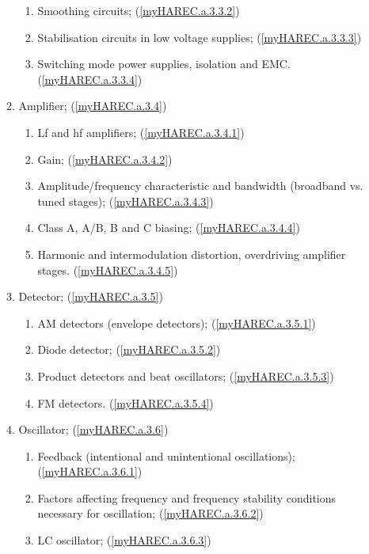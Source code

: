 \begin{enumerate}
\begin{enumerate}[noitemsep]
\begin{enumerate}[noitemsep]
\item Smoothing circuits; (\ref{myHAREC.a.3.3.2})\label{HAREC.a.3.3.2}
\item Stabilisation circuits in low voltage supplies; (\ref{myHAREC.a.3.3.3})\label{HAREC.a.3.3.3}
\item Switching mode power supplies, isolation and EMC. (\ref{myHAREC.a.3.3.4})\label{HAREC.a.3.3.4}
\end{enumerate}
\item Amplifier; (\ref{myHAREC.a.3.4})\label{HAREC.a.3.4}
\begin{enumerate}[noitemsep]
\item Lf and hf amplifiers; (\ref{myHAREC.a.3.4.1})\label{HAREC.a.3.4.1}
\item Gain; (\ref{myHAREC.a.3.4.2})\label{HAREC.a.3.4.2}
\item Amplitude/frequency characteristic and bandwidth (broadband vs. tuned stages); (\ref{myHAREC.a.3.4.3})\label{HAREC.a.3.4.3}
\item Class A, A/B, B and C biasing; (\ref{myHAREC.a.3.4.4})\label{HAREC.a.3.4.4}
\item Harmonic and intermodulation distortion, overdriving amplifier stages. (\ref{myHAREC.a.3.4.5})\label{HAREC.a.3.4.5}
\end{enumerate}
\item Detector; (\ref{myHAREC.a.3.5})\label{HAREC.a.3.5}
\begin{enumerate}[noitemsep]
\item AM detectors (envelope detectors); (\ref{myHAREC.a.3.5.1})\label{HAREC.a.3.5.1}
\item Diode detector; (\ref{myHAREC.a.3.5.2})\label{HAREC.a.3.5.2}
\item Product detectors and beat oscillators; (\ref{myHAREC.a.3.5.3})\label{HAREC.a.3.5.3}
\item FM detectors. (\ref{myHAREC.a.3.5.4})\label{HAREC.a.3.5.4}
\end{enumerate}
\item Oscillator; (\ref{myHAREC.a.3.6})\label{HAREC.a.3.6}
\begin{enumerate}[noitemsep]
\item Feedback (intentional and unintentional oscillations); (\ref{myHAREC.a.3.6.1})\label{HAREC.a.3.6.1}
\item Factors affecting frequency and frequency stability conditions necessary for oscillation; (\ref{myHAREC.a.3.6.2})\label{HAREC.a.3.6.2}
\item LC oscillator; (\ref{myHAREC.a.3.6.3})\label{HAREC.a.3.6.3}

\end{enumerate}
\end{enumerate}
\end{enumerate}
